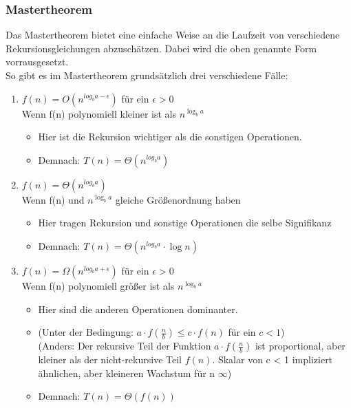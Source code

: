 \documentclass[
../../AuD-Zusammenfassung.tex,
]
{subfiles}
\begin{document}
\subsubsection{Mastertheorem}
Das Mastertheorem bietet eine einfache Weise an die Laufzeit von verschiedene Rekursionsgleichungen abzuschätzen. Dabei wird die oben genannte Form vorrausgesetzt. \\
So gibt es im Mastertheorem grundsätzlich drei verschiedene Fälle:
\begin{enumerate}
    \item $f(n) = O(n^{log_b a-\epsilon})$ für ein $\epsilon > 0$\\
    Wenn f(n) polynomiell kleiner ist als $n^{\log_b a}$
    \begin{itemize}
        \item Hier ist die Rekursion wichtiger als die sonstigen Operationen. 
        \item Demnach: $T(n) = \Theta(n^{log_b a})$
    \end{itemize}
    \item $f(n) = \Theta(n^{log_b a})$\\
    Wenn f(n) und $n^{\log_b a}$ gleiche Größenordnung haben
    \begin{itemize}
        \item Hier tragen Rekursion und sonstige Operationen die selbe Signifikanz 
        \item Demnach: $T(n) = \Theta(n^{log_b a}\cdot \log n)$
    \end{itemize}
    \item $f(n) = \Omega(n^{log_b a+\epsilon})$ für ein $\epsilon > 0$\\
    Wenn f(n) polynomiell größer ist als $n^{\log_b a}$
    \begin{itemize}
        \item Hier sind die anderen Operationen dominanter.
        \item (Unter der Bedingung: $a\cdot f(\frac{n}{b})\leq c \cdot f(n)$ für ein $c < 1$)\\
        (Anders: Der rekursive Teil der Funktion $a\cdot f(\frac{n}{b})$ ist proportional, aber kleiner als der nicht-rekursive Teil $f(n)$. Skalar von c < 1 impliziert ähnlichen, aber kleineren Wachstum für n \rightarrow $\infty$)
        \item Demnach: $T(n) = \Theta(f(n))$
    \end{itemize}
\end{enumerate}
\end{document}
